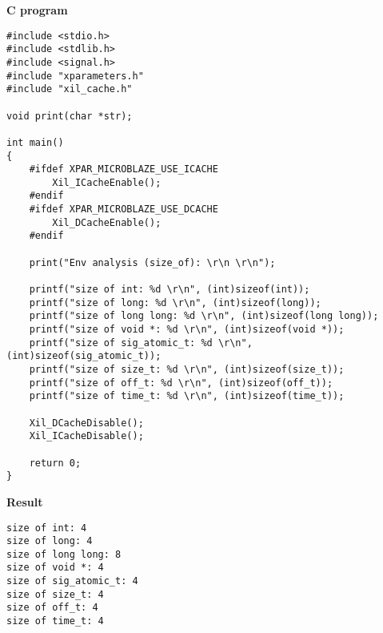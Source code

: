 \textbf{C program}
\begin{verbatim}
#include <stdio.h>
#include <stdlib.h>
#include <signal.h>
#include "xparameters.h"
#include "xil_cache.h"

void print(char *str);

int main()
{
    #ifdef XPAR_MICROBLAZE_USE_ICACHE
        Xil_ICacheEnable();
    #endif
    #ifdef XPAR_MICROBLAZE_USE_DCACHE
        Xil_DCacheEnable();
    #endif

    print("Env analysis (size_of): \r\n \r\n");

    printf("size of int: %d \r\n", (int)sizeof(int));
    printf("size of long: %d \r\n", (int)sizeof(long));
    printf("size of long long: %d \r\n", (int)sizeof(long long));
    printf("size of void *: %d \r\n", (int)sizeof(void *));
    printf("size of sig_atomic_t: %d \r\n", (int)sizeof(sig_atomic_t));
    printf("size of size_t: %d \r\n", (int)sizeof(size_t));
    printf("size of off_t: %d \r\n", (int)sizeof(off_t));
    printf("size of time_t: %d \r\n", (int)sizeof(time_t));

    Xil_DCacheDisable();
    Xil_ICacheDisable();

    return 0;
}
\end{verbatim}

\textbf{Result}
\begin{verbatim}
size of int: 4
size of long: 4
size of long long: 8
size of void *: 4
size of sig_atomic_t: 4
size of size_t: 4
size of off_t: 4
size of time_t: 4
\end{verbatim}